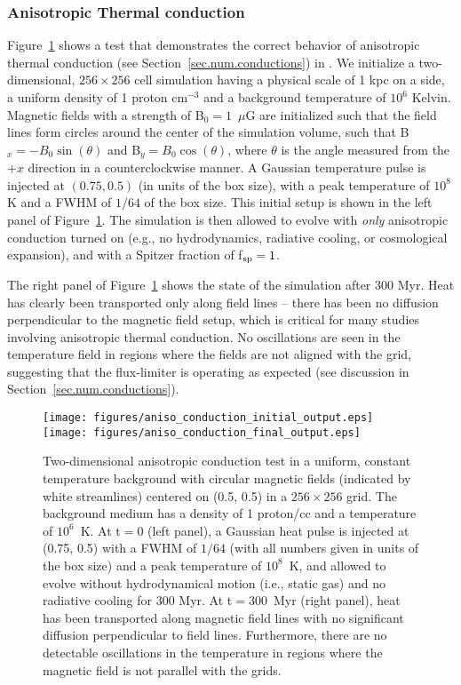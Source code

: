 \subsubsection{Anisotropic Thermal conduction}
\label{sec.tests.conduct}

Figure~\ref{fig.conduct} shows a test that demonstrates the correct
behavior of anisotropic thermal conduction (see
Section~\ref{sec.num.conductions}) in \enzo. We initialize a
two-dimensional, $256 \times 256$ cell simulation having a physical
scale of 1 kpc on a side, a uniform density of 1 proton cm$^{-3}$ and
a background temperature of $10^6$ Kelvin.  Magnetic fields with a
strength of B$_0 = 1$~$\mu$G are initialized such that the field lines
form circles around the center of the simulation volume, such that
B$_x = -B_0\sin(\theta)$ and B$_y = B_0\cos(\theta)$, where $\theta$
is the angle measured from the $+x$ direction in a counterclockwise
manner.  A Gaussian temperature pulse is injected at $(0.75, 0.5)$ (in
units of the box size), with a peak temperature of $10^8$ K and a FWHM
of $1/64$ of the box size.  This initial setup is shown in the left
panel of Figure~\ref{fig.conduct}.  The simulation is then allowed to
evolve with \textit{only} anisotropic conduction turned on (e.g., no
hydrodynamics, radiative cooling, or cosmological expansion), and with
a Spitzer fraction of f$_{\rm sp} = 1$.

The right panel of Figure~\ref{fig.conduct} shows the state of the
simulation after 300 Myr.  Heat has clearly been transported only
along field lines -- there has been no diffusion perpendicular to the
magnetic field setup, which is critical for many studies involving
anisotropic thermal conduction.  No oscillations are seen in the
temperature field in regions where the fields are not aligned with the
grid, suggesting that the flux-limiter is operating as expected (see
discussion in Section~\ref{sec.num.conductions}).

\begin{figure}
\begin{center}
\texttt{[image: figures/aniso\_conduction\_initial\_output.eps]}
\texttt{[image: figures/aniso\_conduction\_final\_output.eps]}
\caption{Two-dimensional anisotropic conduction test in a uniform, constant
temperature background with circular magnetic fields (indicated by white
streamlines) centered on (0.5, 0.5) in a $256 \times 256$ grid. The background
medium has a density of 1 proton/cc and a temperature of $10^6$~K.  At t$ = 0$
(left panel), a Gaussian heat pulse is injected at (0.75, 0.5) with a FWHM of
$1/64$ (with all numbers given in units of the box size) and a peak
temperature of $10^8$~K, and allowed to evolve without hydrodynamical motion
(i.e., static gas) and no radiative cooling for 300 Myr.  At t$ = 300$~Myr
(right panel), heat has been transported along magnetic field lines with no
significant diffusion perpendicular to field lines. Furthermore, there are no
detectable oscillations in the temperature in regions where the magnetic field
is not parallel with the grids.}
\label{fig.conduct}
\end{center}
\end{figure}

